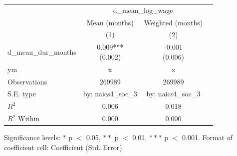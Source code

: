 \renewcommand\cellalign{t}
\begin{threeparttable}
\begin{tabular}{lccc}
\toprule
 & \multicolumn{2}{c}{d_mean_log_wage} \\
\cmidrule(lr){2-3} 
 & Mean (months) & Weighted (months) \\
 & (1) & (2) \\
\midrule
\addlinespace
d_mean_dur_months & \makecell{0.009*** \\ (0.002)} & \makecell{-0.001 \\ (0.006)} \\
\midrule
\addlinespace
ym & x & x \\
\midrule
\addlinespace
Observations & 269989 & 269989 \\
S.E. type & by: naics4_soc_3 & by: naics4_soc_3 \\
$R^2$ & 0.006 & 0.018 \\
$R^2$ Within & 0.000 & 0.000 \\
\bottomrule
\end{tabular}
\footnotesize Significance levels: $*$ p $<$ 0.05, $**$ p $<$ 0.01, $***$ p $<$ 0.001. Format of coefficient cell: Coefficient 
 (Std. Error)
\end{threeparttable}